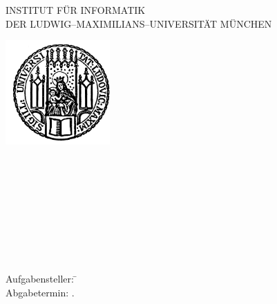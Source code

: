 \begin{center}
\end{center}

\newpage


\thispagestyle{empty}
\cleardoublepage 


\thispagestyle{empty}

\begin{center}

\vspace*{-2cm}

{\Huge INSTITUT FÜR INFORMATIK\\[1mm]}
DER LUDWIG--MAXIMILIANS--UNIVERSITÄT MÜNCHEN\\

\vspace*{1cm}

\includegraphics[width=0.3\textwidth]{lmu_siegel}

\vspace*{2cm}

{\Large \textbf{\typeOfThesis}}\\

\vspace{2.0cm}
{\Huge \textbf{\titleOfThesisOne}}\\
\vspace*{3mm}
{\Huge \textbf{\titleOfThesisTwo}}\\
\vspace*{3mm}
{\Huge \textbf{\titleOfThesisThree}}\\

\vspace{1.5cm}

{\LARGE \authorOfThesis}\\[2mm]
{\LARGE \authorOfThesisOne}\\[2mm]
{\LARGE \authorOfThesisTwo}\\[2mm]

\vspace{2cm}

\parbox{1cm}{
  \begin{large}
    \begin{tabbing}
      Aufgabensteller:
        \=\aufgabensteller\\[10mm]
      Abgabetermin: 
        \> \abgabeTagZahl.~\abgabeMonatText~\abgabeJahrZahl\\
    \end{tabbing}
  \end{large}
}\\

\end{center}
